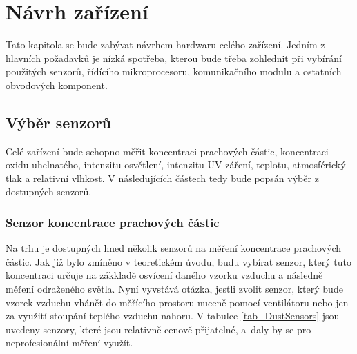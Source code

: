 \chapter{Návrh zařízení}

Tato kapitola se bude zabývat návrhem hardwaru celého zařízení. Jedním z hlavních požadavků je nízká spotřeba, kterou bude třeba zohlednit při vybírání použitých senzorů, řídícího mikroprocesoru, komunikačního modulu a ostatních obvodových komponent. 

\section{Výběr senzorů}
Celé zařízení bude schopno měřit koncentraci prachových částic, koncentraci oxidu uhelnatého, intenzitu osvětlení, intenzitu UV záření, teplotu, atmosférický tlak a relativní vlhkost. V následujících částech tedy bude popsán výběr z dostupných senzorů.

\subsection{Senzor koncentrace prachových částic}

Na trhu je dostupných hned několik senzorů na měření koncentrace prachových částic. Jak již bylo zmíněno v teoretickém úvodu, budu vybírat senzor, který tuto koncentraci určuje na zákkladě osvícení daného vzorku vzduchu a následně měření odraženého světla. Nyní vyvstává otázka, jestli zvolit senzor, který bude vzorek vzduchu vhánět do měřícího prostoru nuceně pomocí ventilátoru nebo jen za využití stoupání teplého vzduchu nahoru. V tabulce \ref{tab_DustSensors} jsou uvedeny senzory, které jsou relativně cenově přijatelné, a~daly by se pro neprofesionální měření využít.

\newcommand{\ugcm}{\micro\gram\per\cubic\meter} %

